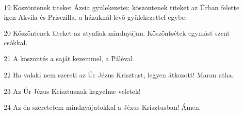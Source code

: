 \par 19 Köszöntenek titeket Ázsia gyülekezetei; köszöntenek titeket az Úrban felette igen Akvila és Prisczilla, a házuknál levõ gyülekezettel  egybe.
\par 20 Köszöntenek titeket az atyafiak mindnyájan. Köszöntsétek egymást szent csókkal.
\par 21 A köszöntés a saját kezemmel, a Páléval.
\par 22 Ha valaki nem szereti az Úr Jézus Krisztust, legyen átkozott! Maran atha.
\par 23 Az Úr Jézus Krisztusnak kegyelme veletek!
\par 24 Az én szeretetem mindnyájatokkal a Jézus Krisztusban! Ámen.


